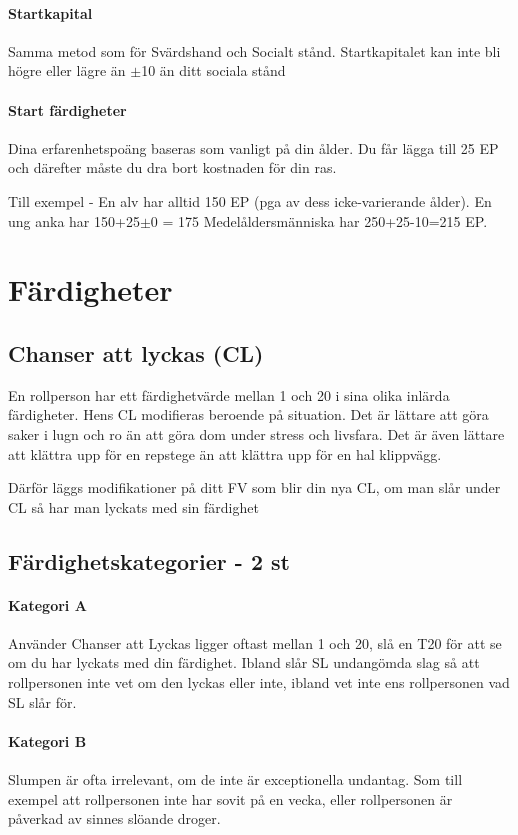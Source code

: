 \documentclass[a4paper, 10pt, titlepage]{article}
\begin{document}
\paragraph{Startkapital} Samma metod som för Svärdshand och Socialt stånd. Startkapitalet kan inte
bli högre eller lägre än $\pm$10 än ditt sociala stånd

\paragraph{Start färdigheter} Dina erfarenhetspoäng baseras som vanligt på din ålder. Du får
lägga till 25 EP och därefter måste du dra bort kostnaden för din ras.

Till exempel - En alv har alltid 150 EP (pga av dess icke-varierande ålder). En ung anka har 150+25$\pm$0 = 175
Medelåldersmänniska har 250+25-10=215 EP.

\section{Färdigheter}

\subsection{Chanser att lyckas (CL)}
En rollperson har ett färdighetvärde mellan 1 och 20 i sina olika inlärda färdigheter. Hens CL modifieras
beroende på situation. Det är lättare att göra saker i lugn och ro än att göra dom under stress och livsfara.
Det är även lättare att klättra upp för en repstege än att klättra upp för en hal klippvägg.

Därför läggs modifikationer på ditt FV som blir din nya CL, om man slår under CL så har man lyckats med
sin färdighet

\subsection{Färdighetskategorier - 2 st}

\paragraph{Kategori A} Använder Chanser att Lyckas ligger oftast mellan 1 och 20, slå en T20 för att
se om du har lyckats med din färdighet. Ibland slår SL undangömda slag så att rollpersonen inte vet om
den lyckas eller inte, ibland vet inte ens rollpersonen vad SL slår för.

\paragraph{Kategori B} Slumpen är ofta irrelevant, om de inte är exceptionella undantag. Som till exempel
att rollpersonen inte har sovit på en vecka, eller rollpersonen är påverkad av sinnes slöande droger.
\end{document}
